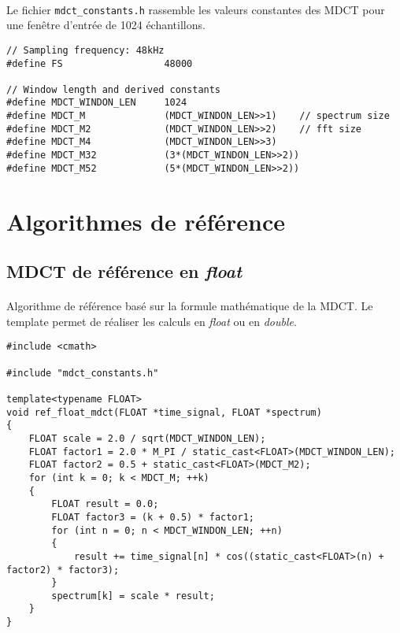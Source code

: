 \documentclass{article}
\begin{document}
\paragraph{}
Le fichier \texttt{mdct\_constants.h} rassemble les valeurs constantes des MDCT pour une fenêtre d'entrée de 1024 échantillons.
\lstset{language=C++}
\begin{lstlisting}
// Sampling frequency: 48kHz
#define FS                  48000

// Window length and derived constants
#define MDCT_WINDON_LEN     1024
#define MDCT_M              (MDCT_WINDON_LEN>>1)    // spectrum size
#define MDCT_M2             (MDCT_WINDON_LEN>>2)    // fft size
#define MDCT_M4             (MDCT_WINDON_LEN>>3)
#define MDCT_M32            (3*(MDCT_WINDON_LEN>>2))
#define MDCT_M52            (5*(MDCT_WINDON_LEN>>2))
\end{lstlisting}



\newpage
\section{Algorithmes de référence}\label{app:mdct_ref}
\subsection{MDCT de référence en \emph{float}}\label{app:mdct_ref_float}
\paragraph{}
Algorithme de référence basé sur la formule mathématique de la MDCT. Le template permet de réaliser les calculs en \emph{float} ou en \emph{double}.
\lstset{language=C++}
\begin{lstlisting}
#include <cmath>

#include "mdct_constants.h"

template<typename FLOAT>
void ref_float_mdct(FLOAT *time_signal, FLOAT *spectrum)
{
    FLOAT scale = 2.0 / sqrt(MDCT_WINDON_LEN);
    FLOAT factor1 = 2.0 * M_PI / static_cast<FLOAT>(MDCT_WINDON_LEN);
    FLOAT factor2 = 0.5 + static_cast<FLOAT>(MDCT_M2);
    for (int k = 0; k < MDCT_M; ++k)
    {
        FLOAT result = 0.0;
        FLOAT factor3 = (k + 0.5) * factor1;
        for (int n = 0; n < MDCT_WINDON_LEN; ++n)
        {
            result += time_signal[n] * cos((static_cast<FLOAT>(n) + factor2) * factor3);
        }
        spectrum[k] = scale * result;
    }
}
\end{lstlisting}
\end{document}
